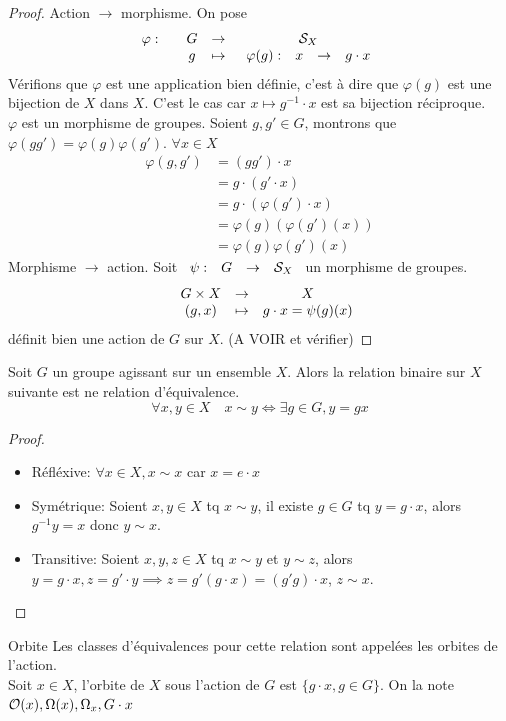 \documentclass[]{report}
\begin{document}
\begin{proof}{}{}
    Action $\to $ morphisme. On pose 
    \[\begin{array}{ccccc} \varphi : & & G & \to & \mathcal{S}_X \\ & & g & \mapsto & \begin{array}{ccccc} \varphi(g) : & x & \to & g\cdot x \end{array} \end{array}\]
    Vérifions que $\varphi$ est une application bien définie, c'est à dire que $\varphi(g)$ est une bijection de $X$ dans $X$. C'est le cas car $x\mapsto g^{-1}\cdot x$ est sa bijection réciproque.\\
    $\varphi$ est un morphisme de groupes. Soient $g,g'\in G$, montrons que $\varphi(gg')=\varphi(g)\varphi(g')$. $\forall x\in X$
    \begin{align*}
        \varphi (g,g')&=(gg')\cdot x\\
        &=g\cdot(g'\cdot x)\\
        &= g\cdot (\varphi(g')\cdot x)\\
        &= \varphi (g) \left(\varphi(g')(x)\right)\\
        &=\varphi(g) \varphi(g')(x)
    \end{align*}
    Morphisme $\to$ action. Soit $\begin{array}{ccccc} \psi : & G & \to & \mathcal{S}_X \end{array}$ un morphisme de groupes.
    \[\begin{array}{ccccc} & G\times X & \to & X \\ & (g,x) & \mapsto & g\cdot x=\psi (g) (x) \end{array}\]
    définit bien une action de $G$ sur $X$. (A VOIR et vérifier)
\end{proof}

\begin{prop}{}{}
    Soit $G$ un groupe agissant sur un ensemble $X$. Alors la relation binaire sur $X$ suivante est ne relation d'équivalence.
    \[\forall x,y\in X\quad x\sim y\iff \exists g\in G, y=gx\]
\end{prop}

\begin{proof}{}{}
    \begin{itemize}
        \item Réfléxive: $\forall x\in X, x\sim x$ car $x= e\cdot x$
        \item Symétrique: Soient $x,y\in X$ tq $x\sim y$, il existe $g\in G$ tq $y=g\cdot x$, alors $g^{-1}y=x$ donc $y\sim x$.
        \item Transitive: Soient $x,y,z\in X$ tq $x\sim y$ et $y\sim z$, alors $y=g\cdot x,z=g'\cdot y\implies z=g'(g\cdot x)=(g'g)\cdot x$, $z\sim x$.
    \end{itemize}
\end{proof}

\begin{df}{Orbite}{}
    Les classes d'équivalences pour cette relation sont appelées les orbites de l'action.\\
    Soit $x\in X$, l'orbite de $X$ sous l'action de $G$ est $\{g\cdot x,g\in G\}$. On la note $\mathcal{O}(x),\Omega(x),\Omega_x,G\cdot x$
\end{df}
\end{document}
